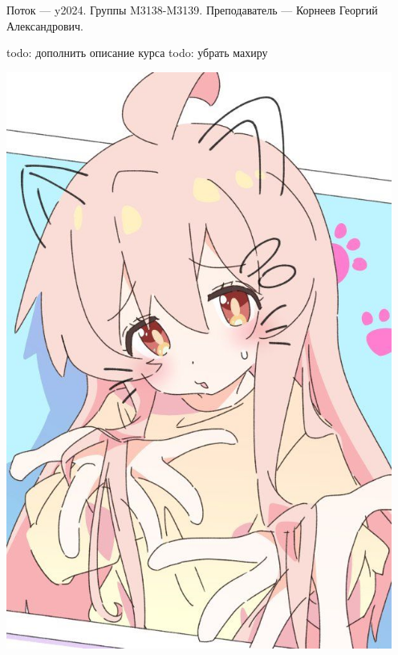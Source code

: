 Поток — y2024.\newline
Группы M3138-M3139.\newline
Преподаватель --- Корнеев Георгий Александрович.\par

todo: дополнить описание курса
todo: убрать махиру
\begin{center}
   \includegraphics[height=19cm]{assets/mahiru.jpg}
\end{center}